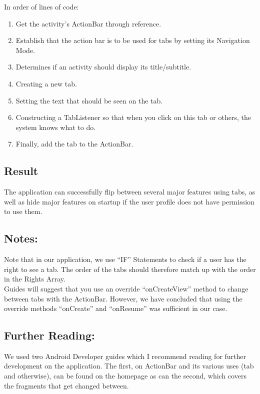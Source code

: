 \noindent In order of lines of code:
\begin{enumerate}
\item Get the activity's ActionBar through reference.
\item Establish that the action bar is to be used for tabs by setting its Navigation Mode.
\item Determines if an activity should display its title/subtitle.
\item Creating a new tab.
\item Setting the text that should be seen on the tab.
\item Constructing a TabListener so that when you click on this tab or others, the system knows what to do.
\item Finally, add the tab to the ActionBar.
\end{enumerate}

\subsection*{Result}
The application can successfully flip between several major features using tabs, as well as hide major features on startup if the user profile does not have permission to use them.

\subsection*{Notes:}
Note that in our application, we use ``IF'' Statements to check if a user has the right to see a tab.
The order of the tabs should therefore match up with the order in the Rights Array.\\
Guides will suggest that you use an override ``onCreateView'' method to change between tabs with the ActionBar.
However, we have concluded that using the override methods ``onCreate'' and ``onResume'' was sufficient in our case.

\subsection*{Further Reading:}
We used two Android Developer guides which I recommend reading for further development on the application.
The first, on ActionBar and its various uses (tab and otherwise), can be found on the homepage \cite{actionbarguide} as can the second, which covers the fragments that get changed between.\cite{fragmentguide}